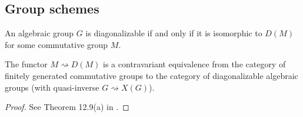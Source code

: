 \subsection{Group schemes}

\begin{theorem}
  \label{diag_iff_D}
  An algebraic group $G$ is diagonalizable
  if and only if it is isomorphic to $D(M)$ for some commutative group $M$.
\end{theorem}

\begin{theorem}
  \label{congr_fggrp_diag}
  The functor $M\rightsquigarrow D(M)$ is a contravariant equivalence
  from the category of finitely generated commutative groups to the category of
  diagonalizable algebraic groups (with quasi-inverse $G \rightsquigarrow X(G)$).
\end{theorem}
\begin{proof}
  See Theorem 12.9(a) in \cite{Milne_2017}.
\end{proof}
